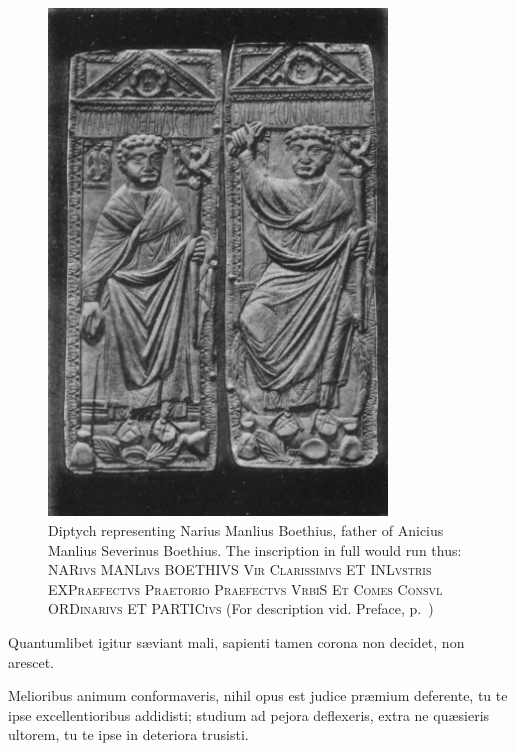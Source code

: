 \documentclass[12pt]{book}
\begin{document}
\begin{figure}[ht!]
\centering
\includegraphics[width=90mm]{image01.jpg}
\caption{Diptych representing Narius Manlius Boethius, father of
Anicius Manlius Severinus Boethius. The inscription in full would run
thus: \textsc{NARivs MANLivs BOETHIVS Vir Clarissimvs ET INLvstris
EXPraefectvs Praetorio Praefectvs VrbiS Et Comes Consvl ORDinarivs ET
PARTICivs} (For description vid. Preface, p.~\pageref{diptych})}
\end{figure}


\vfill

\maketitle

\hspace{0pt}
\vfill

Quantumlibet igitur sæviant mali, sapienti tamen corona non
decidet, non arescet.

Melioribus animum conformaveris, nihil opus est judice præmium      
deferente, tu te ipse excellentioribus addidisti; studium ad pejora     
deflexeris, extra ne quæsieris ultorem, tu te ipse in deteriora        
trusisti.                                                               

\vfill
\pagebreak
\end{document}
